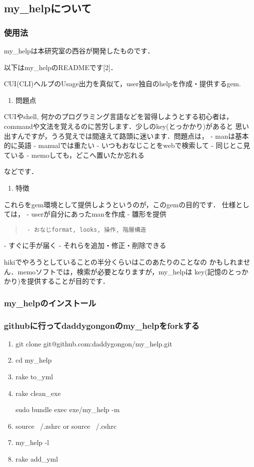 
\subsection{my\_helpについて}
\subsubsection{使用法}
my\_helpは本研究室の西谷が開発したものです．

以下はmy\_helpのREADMEです[2]．

CUI(CLI)ヘルプのUsage出力を真似て，user独自のhelpを作成・提供するgem.

\begin{enumerate}
\item 問題点
\end{enumerate}
CUIやshell, 何かのプログラミング言語などを習得しようとする初心者は，
commandや文法を覚えるのに苦労します．少しのkey(とっかかり)があると
思い出すんですが，うろ覚えでは間違えて路頭に迷います．問題点は，
- manは基本的に英語
- manualでは重たい
- いつもおなじことをwebで検索して
- 同じとこ見ている
- memoしても，どこへ置いたか忘れる

などです．

\begin{enumerate}
\item 特徴
\end{enumerate}
これらをgem環境として提供しようというのが，このgemの目的です．
仕様としては，
- userが自分にあったmanを作成
- 雛形を提供
\begin{quote}\begin{verbatim}
 - おなじformat, looks, 操作, 階層構造
\end{verbatim}\end{quote}
- すぐに手が届く
- それらを追加・修正・削除できる

hikiでやろうとしていることの半分くらいはこのあたりのことなの
かもしれません．memoソフトでは，検索が必要となりますが，my\_helpは
key(記憶のとっかかり)を提供することが目的です．

\subsubsection{my\_helpのインストール}
\subsubsection{githubに行ってdaddygongonのmy\_helpをforkする}
\begin{enumerate}
\item git clone git@github.com:daddygongon/my\_help.git
\item cd my\_help
\item rake to\_yml
\item rake clean\_exe
\item [sudo] bundle exec exe/my\_help -m
\item source ~/.zshrc or source ~/.cshrc
\item my\_help -l
\item rake add\_yml
\end{enumerate}
